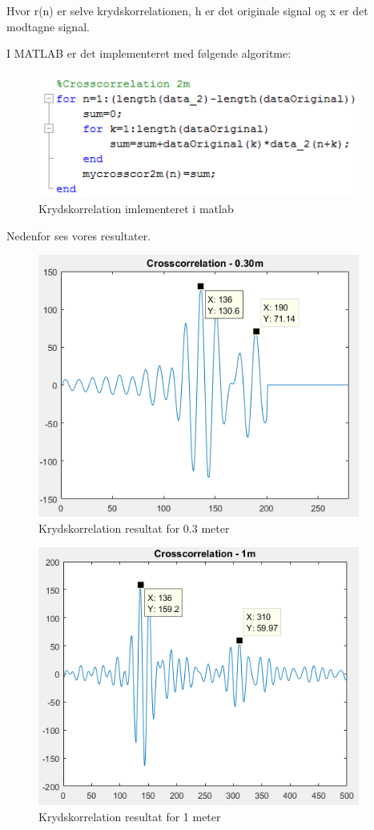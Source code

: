 Hvor r(n) er selve krydskorrelationen, h er det originale signal og x er det modtagne signal.

I MATLAB er det implementeret med følgende algoritme:

\begin{figure}[H]
\centering
\includegraphics[width = 300pt]{Img/Matlab.PNG}
\caption{Krydskorrelation imlementeret i matlab}
\label{fig:Matlab}
\end{figure}

Nedenfor ses vores resultater.

\begin{figure}[H]
\centering
\includegraphics[width = 300pt]{Img/03m.PNG}
\caption{Krydskorrelation resultat for 0.3 meter}
\label{fig:03m}
\end{figure}

\begin{figure}[H]
\centering
\includegraphics[width = 300pt]{Img/1m.PNG}
\caption{Krydskorrelation resultat for 1 meter}
\label{fig:1m}
\end{figure}

